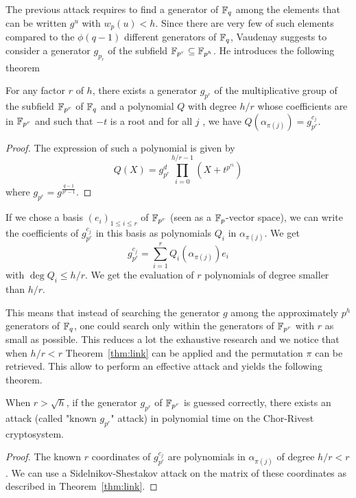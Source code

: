 \documentclass[a4paper]{article}
\newcommand{\GF}[1]{\F_{#1}}
\begin{document}
The previous attack requires to find a generator of $\mathbb{F}_q$ among the elements that can be written $g^u$ with $w_p(u) < h$. Since there are very few of such elements compared to the $\phi(q-1)$ different generators of $\mathbb{F}_q$, Vaudenay suggests \cite{Vau01} to consider a generator $g_{p_r}$ of the subfield $\mathbb{F}_{p^r} \subseteq \mathbb{F}_{p^h}$. He introduces the following theorem
\begin{theorem}
For any factor $r$ of $h$, there exists a generator $g_{p^r}$ of the multiplicative group of the subfield $\mathbb{F}_{p^r}$ of $\mathbb{F}_q$ and a polynomial $Q$ with degree $h/r$ whose coefficients are in $\mathbb{F}_{p^r}$ and such that $-t$ is a root and for all $j$ , we have $Q(\alpha_{\pi(j)}) = g_{p^r}^{c_j}$.
\end{theorem}
\begin{proof}
The expression of such a polynomial is given by
$$ Q(X) = g_{p^r}^d \prod_{i=0}^{h/r-1} \left( X + t^{p^{ri}} \right) $$
where $g_{p^r} = g^{\frac{q-1}{p^r-1}}$. 
\end{proof}

If we chose a basis $(e_i)_{1 \leq i \leq r}$ of $\GF{p^r}$ (seen as a $\mathbb{F}_p$-vector space), we can write the coefficients of $g_{p^r}^{c_j}$ in this basis as polynomials $Q_i$ in $\alpha_{\pi(j)}$. We get
$$ g_{p^r}^{c_j} = \sum_{i=1}^r Q_i(\alpha_{\pi(j)}) e_i $$
with $\deg Q_i \leq h/r$. We get the evaluation of $r$ polynomials of degree smaller than $h/r$.

This means that instead of searching the generator $g$ among the approximately $p^h$ generators of $\mathbb{F}_q$, one could search only within the generators of $\mathbb{F}_{p^r}$ with $r$ as small as possible. This reduces a lot the exhaustive research and we notice that when $h/r < r$ Theorem~\ref{thm:link} can be applied and the permutation $\pi$ can be retrieved. This allow to perform an effective attack and yields the following theorem.

\begin{theorem}
When $r > \sqrt{h}$, if the generator $g_{p^r}$ of $\GF{p^r}$ is guessed correctly, there exists an attack (called "known $g_{p^r}$" attack) in polynomial time on the Chor-Rivest cryptosystem.
\end{theorem}
\begin{proof}
The known $r$ coordinates of $g_{p^r}^{c_j}$ are polynomials in $\alpha_{\pi(j)}$ of degree $h/r < r$. We can use a Sidelnikov-Shestakov attack on the matrix of these coordinates as described in Theorem~\ref{thm:link}.
\end{proof}
\end{document}
